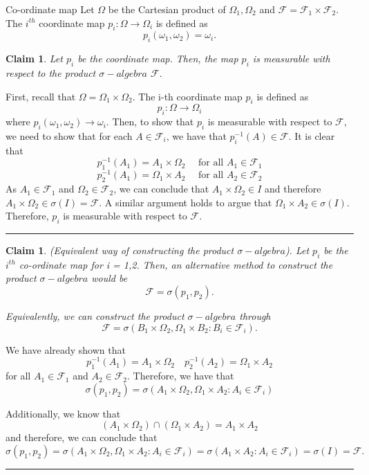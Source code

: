 \documentclass[twoside]{article}
\newtheorem{claim}[theorem]{Claim}
\newenvironment{proof}{{\bf Proof:}}{\hfill\rule{2mm}{2mm}}
\newcommand{\sigmalgebra}{\mathcal{F}}
\newcommand{\sa}{\sigma-algebra}
\begin{document}
\begin{definition_exam}{Co-ordinate map}{} Let $\Omega$ be the Cartesian product of $\Omega_1, \Omega_2$ and $\sigmalgebra = \sigmalgebra_1 \times \sigmalgebra_2.$ The $i^{th}$ coordinate map $p_i: \Omega \rightarrow \Omega_i$ is defined as 
$$
p_i(\omega_1, \omega_2) = \omega_i.
$$
\end{definition_exam}

\begin{claim}Let $p_i$ be the coordinate map. Then, the map $p_i$ is measurable with respect to the product $\sa$ $\sigmalgebra.$
\end{claim}

\begin{proof} First, recall that $\Omega = \Omega_1 \times \Omega_2.$ The i-th coordinate map $p_i$ is defined as 
$$
p_i: \Omega \rightarrow \Omega_i
$$
where $p_i(\omega_1, \omega_2) \rightarrow \omega_i.$ Then, to show that $p_i$ is measurable with respect to $\sigmalgebra,$ we need to show that for each $A \in \sigmalgebra_i$, we have that $p_i^{-1}(A) \in \sigmalgebra.$ It is clear that 
$$
p_1^{-1}(A_1) = A_1 \times \Omega_2 \quad \text{ for all } A_1 \in \sigmalgebra_1
$$
$$
p_2^{-1}(A_1) = \Omega_1 \times A_2 \quad \text{ for all } A_2 \in \sigmalgebra_2
$$
As $A_1 \in \sigmalgebra_1$ and $\Omega_2 \in \sigmalgebra_2$, we can conclude that $A_1 \times \Omega_2 \in I$ and therefore $A_1 \times \Omega_2 \in \sigma(I) = \sigmalgebra.$ A similar argument holds to argue that $\Omega_1 \times A_2 \in \sigma(I).$ Therefore, $p_i$ is measurable with respect to $\sigmalgebra.$
\end{proof}

\begin{claim}(Equivalent way of constructing the product $\sa$). Let $p_i$ be the $i^{th}$ co-ordinate map for i = 1,2. Then, an alternative method to construct the product $\sa$ would be 
$$
\sigmalgebra = \sigma(p_1,p_2).
$$

Equivalently, we can construct the product $\sa$ through 
$$
\sigmalgebra = \sigma(B_1 \times \Omega_2, \Omega_1 \times B_2: B_i \in \sigmalgebra_i).
$$
\end{claim}

\begin{proof} We have already shown that 
$$
p_1^{-1}(A_1) = A_1 \times \Omega_2 \quad p_2^{-1}(A_2) = \Omega_1 \times A_2
$$
for all $A_1 \in \sigmalgebra_1$ and $A_2 \in \sigmalgebra_2.$ Therefore, we have that 
$$
\sigma(p_1, p_2) = \sigma(A_1 \times \Omega_2, \Omega_1 \times A_2: A_i \in \sigmalgebra_i)
$$

Additionally, we know that 
$$
(A_1 \times \Omega_2) \cap (\Omega_1 \times A_2) = A_1 \times A_2
$$
and therefore, we can conclude that 
$$
\sigma(p_1, p_2) = \sigma(A_1 \times \Omega_2, \Omega_1 \times A_2: A_i \in \sigmalgebra_i) = \sigma(A_1 \times A_2: A_i \in \sigmalgebra_i) = \sigma(I) = \sigmalgebra.
$$
\end{proof}
\end{document}
